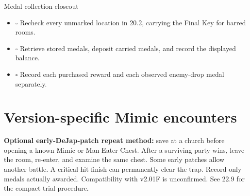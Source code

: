 \begin{routecheck}[breakable=false]{Medal collection closeout}
\begin{itemize}
\item \(\square\) Recheck every unmarked location in 20.2, carrying the Final Key for barred rooms.
\item \(\square\) Retrieve stored medals, deposit carried medals, and record the displayed balance.
\item \(\square\) Record each purchased reward and each observed enemy-drop medal separately.
\end{itemize}
\end{routecheck}

\section{Version-specific Mimic encounters}

\textbf{Optional early-DeJap-patch repeat method:} save at a church before
opening a known Mimic or Man-Eater Chest. After a surviving party wins,
leave the room, re-enter, and examine the same chest. Some early patches
allow another battle. A critical-hit finish can permanently clear the
trap. Record only medals actually awarded. Compatibility with v2.01F
is unconfirmed. See 22.9 for the compact trial procedure.

